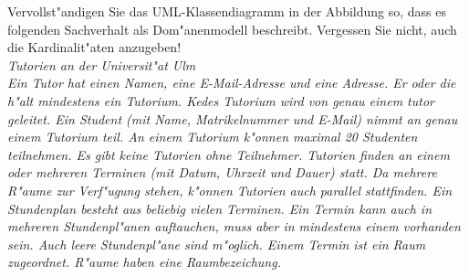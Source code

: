 \documentclass[12pt]{exam}
\begin{document}
\begin{questions}
\question[8] Vervollst"andigen Sie das UML-Klassendiagramm in der Abbildung so, dass es folgenden Sachverhalt als Dom"anenmodell beschreibt. Vergessen Sie nicht, auch die Kardinalit"aten anzugeben! \\
\emph{Tutorien an der Universit"at Ulm \\Ein Tutor hat einen Namen, eine E-Mail-Adresse und eine Adresse. Er oder die h"alt mindestens ein Tutorium. Kedes Tutorium wird von genau einem tutor geleitet. Ein Student (mit Name, Matrikelnummer und E-Mail) nimmt an genau einem Tutorium teil. An einem Tutorium k"onnen maximal 20 Studenten teilnehmen. Es gibt keine Tutorien ohne Teilnehmer. Tutorien finden an einem oder mehreren Terminen (mit Datum, Uhrzeit und Dauer) statt. Da mehrere R"aume zur Verf"ugung stehen, k"onnen Tutorien auch parallel stattfinden. Ein Stundenplan besteht aus beliebig vielen Terminen. Ein Termin kann auch in mehreren Stundenpl"anen auftauchen, muss aber in mindestens einem vorhanden sein. Auch leere Stundenpl"ane sind m"oglich. Einem Termin ist ein Raum zugeordnet. R"aume haben eine Raumbezeichung.} \\
\addpoints
{}


\end{questions}
\end{document}
